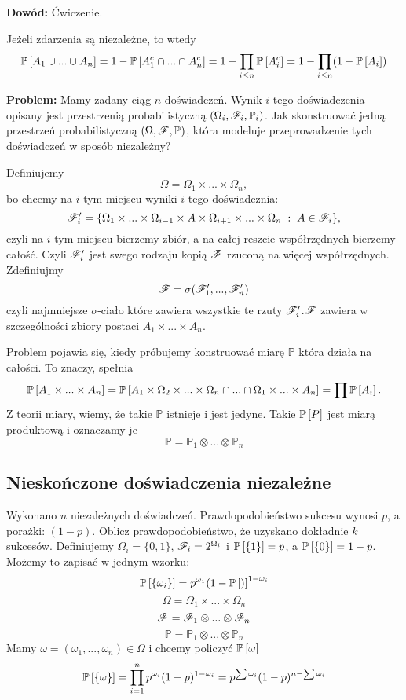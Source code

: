 \textbf{Dowód:} {\large\color{orange}Ćwiczenie}.

 Jeżeli zdarzenia są niezależne, to wtedy 
$$\mathbb{P}\left[A_1\cup...\cup A_n\right]=1-\mathbb{P}\left[A_1^c\cap...\cap A_n^c\right]=1-\prod\limits_{i\leq n}\mathbb{P}\left[A_i^c\right]=1-\prod\limits_{i\leq n}(1-\mathbb{P}\left[A_i\right])$$

\textbf{Problem:} Mamy zadany ciąg $n$ doświadczeń. Wynik $i$-tego doświadczenia opisany jest przestrzenią probabilistyczną $(\Omega_i,\mathcal{F}_i,\mathbb{P}_i)$. Jak skonstruować jedną przestrzeń probabilistyczną $(\Omega, \mathcal{F}, \mathbb{P})$, która modeluje przeprowadzenie tych doświadczeń w sposób niezależny?

Definiujemy
$$\Omega=\Omega_1\times...\times\Omega_n,$$
bo chcemy na $i$-tym miejscu wyniki $i$-tego doświadcznia:
$$\mathcal{F}_i'=\{\Omega_1\times...\times\Omega_{i-1}\times A\times\Omega_{i+1}\times...\times\Omega_n\;:\;A\in\mathcal{F}_i\},$$
czyli na $i$-tym miejscu bierzemy zbiór, a na całej reszcie współrzędnych bierzemy całość. Czyli $\mathcal{F}_i'$ jest swego rodzaju kopią $\mathcal{F}$ rzuconą na więcej współrzędnych. Zdefiniujmy
$$\mathcal{F}=\sigma(\mathcal{F}_1',...,\mathcal{F}_n')$$
czyli najmniejsze $\sigma$-ciało które zawiera wszystkie te rzuty $\mathcal{F}_i'$.$\mathcal{F}$ zawiera w szczególności zbiory postaci $A_1\times...\times A_n$.

Problem pojawia się, kiedy próbujemy konstruować miarę $\mathbb{P}$ która działa na całości. To znaczy, spełnia
$$\mathbb{P}\left[A_1\times...\times A_n\right]=\mathbb{P}\left[A_1\times\Omega_2\times...\times\Omega_n\cap...\cap\Omega_1\times...\times A_n\right]=\prod\mathbb{P}\left[A_i\right].$$
Z teorii miary, wiemy, że takie $\mathbb{P}$ istnieje i jest jedyne. Takie $\mathbb{P}\left[P\right]$ jest miarą produktową i oznaczamy je
$$\mathbb{P}=\mathbb{P}_1\otimes...\otimes\mathbb{P}_n$$

\subsection{Nieskończone doświadczenia niezależne}

Wykonano $n$ niezależnych doświadczeń. Prawdopodobieństwo sukcesu wynosi $p$, a porażki: $(1-p)$. Oblicz prawdopodobieństwo, że uzyskano dokładnie $k$ sukcesów. Definiujemy $\Omega_i=\{0,1\}$, $\mathcal{F}_i=2^{\Omega_i}$ i $\mathbb{P}\left[\{1\}\right]=p$, a $\mathbb{P}\left[\{0\}\right]=1-p$. Możemy to zapisać w jednym wzorku:
$$\mathbb{P}\left[\{\omega_i\}\right]=p^{\omega_1}(1-\mathbb{P}\left[)\right]^{1-\omega_i}$$
$$\Omega=\Omega_1\times...\times\Omega_n$$
$$\mathcal{F}=\mathcal{F}_1\otimes...\otimes \mathcal{F}_n$$
$$\mathbb{P}=\mathbb{P}_1\otimes...\otimes\mathbb{P}_n$$
Mamy $\omega=(\omega_1,...,\omega_n)\in\Omega$ i chcemy policzyć $\mathbb{P}\left[\omega\right]$
$$\mathbb{P}\left[\{\omega\}\right]=\prod\limits_{i=1}^np^{\omega_i}(1-p)^{1-\omega_i}=p^{\sum\omega_i}(1-p)^{n-\sum\omega_i}$$

